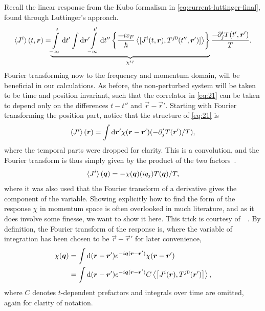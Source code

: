 Recall the linear response from the Kubo formalism in \cref{eq:current-luttinger-final}, found through Luttinger's approach.
\begin{equation}
  \label{eq:21}
  \braket{J^i}(t, \vec{r}) = \!\!
  \underbrace{
    \int\limits_{-\infty }^{t} \mathrm{d}t'
    \int \mathrm{d}\vec{r}' \!\!
  \int\limits_{-\infty }^{t'} \mathrm{d}t''
  \left\{
    \frac{-i v_F}{\hbar }
    \Braket{
      [J^i(t, \vec{r}), T^{j 0} (t'', \vec{r}')]
    }
  \right\}
  }_{\chi^{ij}}
  \frac{- \partial _j' T(t', \vec{r}')}{T}.
\end{equation}
Fourier transforming now to the frequency and momentum domain, will be beneficial in our calculations.
As before, the non-perturbed system will be taken to be time and position invariant, such that the correlator in \cref{eq:21} can be taken to depend only on the differences $t-t''$ and $\vec{r} - \vec{r}' $.
Starting with Fourier transforming the position part, notice that the structure of \cref{eq:21} is
\[
  \braket{J^i}(\vec{r}) = \int \mathrm{d} \vec{r}' \chi (\vec{r} - \vec{r}') (-\partial _j' T(\vec{r}') /T),
\]
where the temporal parts were dropped for clarity.
This is a convolution, and the Fourier transform is thus simply given by the product of the two factors~\cite{rottmannMatematiskFormelsamling1995}.
\begin{equation}
  \braket{J^i}(\vec{q}) = -
  \chi (\vec{q}) (iq_j) T(\vec{q}) /T,
\end{equation}
where it was also used that the Fourier transform of a derivative gives the component of the variable.
Showing explicitly how to find the form of the response $\chi $ in momentum space is often overlooked in much literature, and as it does involve some finesse, we want to show it here.
This trick is courtesy of~\citeauthor{changLectureNotesManybody2018}~\cite{changLectureNotesManybody2018}.
By definition, the Fourier transform of the response is, where the variable of integration has been chosen to be $\vec{r}-\vec{r}'$ for later convenience,
\begin{align}
  \chi (\vec{q}) &= \int \mathrm{d}(\vec{r} - \vec{r}') e^{-i\vec{q}(\vec{r}-\vec{r}')} \chi (\vec{r} - \vec{r}')\\
                 &= \int \mathrm{d}(\vec{r} - \vec{r}') e^{-i\vec{q}(\vec{r}-\vec{r}')} C \Braket{
                   \left[
J^i (\vec{r}), T^{j 0}(\vec{r}')
                   \right]},\\
\end{align}
where $C$ denotes $t$-dependent prefactors and integrals over time are omitted, again for clarity of notation.
